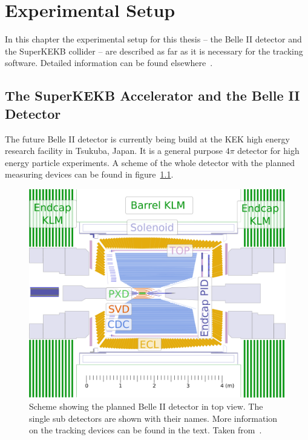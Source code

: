 \chapter{Experimental Setup} \label{chapter-ex}
In this chapter the experimental setup for this thesis -- the Belle II detector and the SuperKEKB collider -- are described as far as it is necessary for the tracking software. Detailed information can be found elsewhere~\cite{tdr}.


\section{The SuperKEKB Accelerator and the Belle II Detector}

The future Belle II detector is currently being build at the KEK high energy research facility in Tsukuba, Japan. It is a general purpose $4\pi$ detector for high energy particle experiments. A scheme of the whole detector with the planned measuring devices can be found in figure~\ref{fig-belle2}.

\begin{figure}
 \centering
 \includegraphics[height=0.4\textheight]{figures/experimental_setup/detector_crossection_labels.pdf}
 \caption[Schema of the planned Belle II detector.]{Scheme showing the planned Belle II detector in top view. The single sub detectors are shown with their names. More information on the tracking devices can be found in the text. Taken from~\cite{christian}.}
 \label{fig-belle2}
\end{figure}

